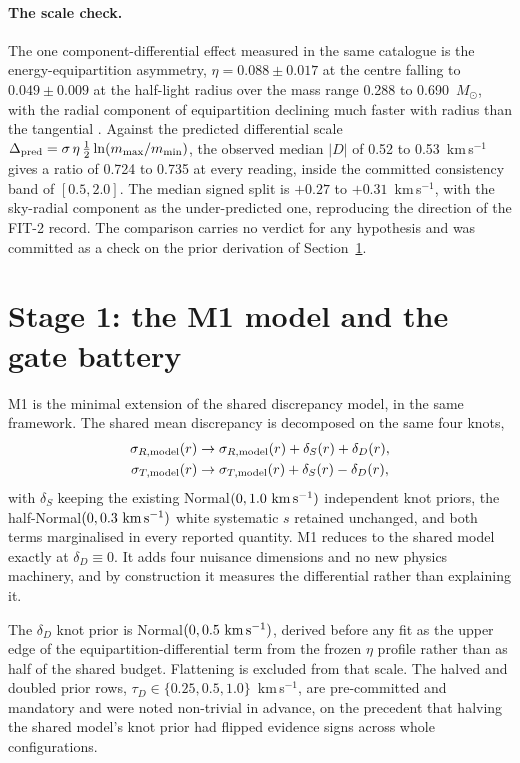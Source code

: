 \documentclass[11pt]{article}
\newcommand{\msun}{\ensuremath{M_\odot}}
\newcommand{\dD}{\ensuremath{\delta_D}}
\newcommand{\dS}{\ensuremath{\delta_S}}
\newcommand{\tD}{\ensuremath{\tau_D}}
\begin{document}
\paragraph{The scale check.} The one component-differential effect measured in the same catalogue is the energy-equipartition asymmetry, $\eta = 0.088 \pm 0.017$ at the centre falling to $0.049 \pm 0.009$ at the half-light radius over the mass range 0.288 to 0.690~\msun{}, with the radial component of equipartition declining much faster with radius than the tangential \citep{Haberle2025oMEGACatVI}. Against the predicted differential scale $\Delta_{\rm pred} = \sigma\,\eta\,\tfrac12 \ln(m_{\max}/m_{\min})$, the observed median $|D|$ of 0.52 to 0.53~km\,s$^{-1}$ gives a ratio of 0.724 to 0.735 at every reading, inside the committed consistency band of $[0.5, 2.0]$. The median signed split is $+0.27$ to $+0.31$~km\,s$^{-1}$, with the sky-radial component as the under-predicted one, reproducing the direction of the FIT-2 record. The comparison carries no verdict for any hypothesis and was committed as a check on the prior derivation of Section~\ref{sec:m1}.

\section{Stage 1: the M1 model and the gate battery}
\label{sec:m1}

M1 is the minimal extension of the shared discrepancy model, in the same framework. The shared mean discrepancy is decomposed on the same four knots,
\begin{align}
\sigma_{R,\rm model}(r) &\rightarrow \sigma_{R,\rm model}(r) + \dS(r) + \dD(r), \\
\sigma_{T,\rm model}(r) &\rightarrow \sigma_{T,\rm model}(r) + \dS(r) - \dD(r),
\end{align}
with \dS{} keeping the existing Normal$(0, 1.0\ {\rm km\,s^{-1}})$ independent knot priors, the half-Normal$(0, 0.3\ {\rm km\,s^{-1}})$ white systematic $s$ retained unchanged, and both terms marginalised in every reported quantity. M1 reduces to the shared model exactly at $\dD \equiv 0$. It adds four nuisance dimensions and no new physics machinery, and by construction it measures the differential rather than explaining it.

The \dD{} knot prior is Normal$(0, 0.5\ {\rm km\,s^{-1}})$, derived before any fit as the upper edge of the equipartition-differential term from the frozen $\eta$ profile rather than as half of the shared budget. Flattening is excluded from that scale. The halved and doubled prior rows, $\tD \in \{0.25, 0.5, 1.0\}$~km\,s$^{-1}$, are pre-committed and mandatory and were noted non-trivial in advance, on the precedent that halving the shared model's knot prior had flipped evidence signs across whole configurations.
\end{document}
